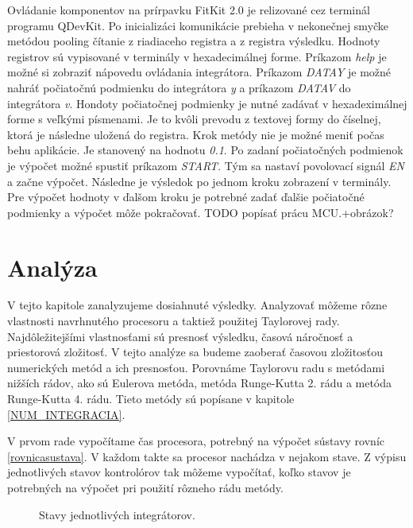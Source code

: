 Ovládanie komponentov na prírpavku FitKit 2.0 je relizované cez terminál programu QDevKit. Po inicializáci komunikácie prebieha v nekonečnej smyčke metódou pooling čítanie z riadiaceho registra a z registra výsledku. Hodnoty registrov sú vypisované v terminály v hexadecimálnej forme. Príkazom \textit{help} je možné si zobraziť nápovedu ovládania integrátora. Príkazom \textit{DATAY} je možné nahráť počiatočnú podmienku do integrátora \textit{y} a príkazom \textit{DATAV} do integrátora \textit{v}. Hondoty počiatočnej podmienky je nutné zadávať v hexadeximálnej forme s veľkými písmenami. Je to kvôli prevodu z textovej formy do číselnej, ktorá je následne uložená do registra. Krok metódy nie je možné meniť počas behu aplikácie. Je stanovený na hodnotu \textit{0.1}. Po zadaní počiatočných podmienok je výpočet možné spustiť príkazom \textit{START}. Tým sa nastaví povolovací signál \textit{EN} a začne výpočet. Následne je výsledok po jednom kroku zobrazení v terminály. Pre výpočet hodnoty v ďalšom kroku je potrebné zadať ďalšie počiatočné podmienky a výpočet môže pokračovať.
TODO popísať prácu MCU.+obrázok? 


\chapter{Analýza}
V tejto kapitole zanalyzujeme dosiahnuté výsledky. Analyzovať môžeme rôzne vlastnosti navrhnutého procesoru a taktiež použitej Taylorovej rady. Najdôležitejšími vlastnosťami sú presnosť výsledku, časová náročnosť a priestorová zložitosť. V tejto analýze sa budeme zaoberať časovou zložitosťou numerických metód a ich presnosťou. Porovnáme Taylorovu radu s metódami nižších rádov, ako sú Eulerova metóda, metóda Runge-Kutta 2. rádu a metóda Runge-Kutta 4. rádu. Tieto metódy sú popísane v kapitole \ref{NUM_INTEGRACIA}.

V prvom rade vypočítame čas procesora, potrebný na výpočet sústavy rovníc \ref{rovnicasustava}. V každom takte sa procesor nachádza v nejakom stave. Z výpisu jednotlivých stavov kontrolórov tak môžeme vypočítať, koľko stavov je potrebných na výpočet pri použití rôzneho rádu metódy.

\bigskip
\begin{figure}[h]
\centering
{}
\caption{Stavy jednotlivých integrátorov.}
\label{stavyimg}
\end{figure}

